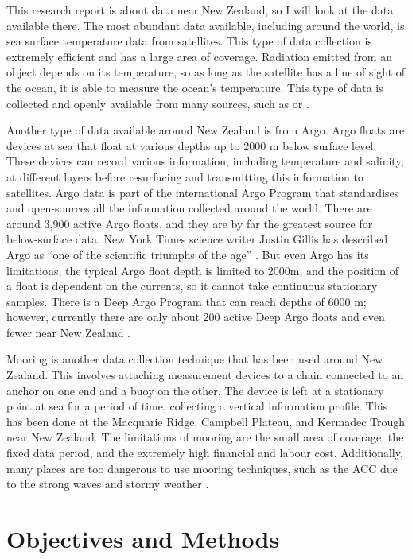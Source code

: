 \documentclass[12pt,a4paper]{article}
\begin{document}
This research report is about data near New Zealand, so I will look at the
data available there. The most abundant data available, including around the
world, is sea surface temperature data from satellites. This type of data
collection is extremely efficient and has a large area of coverage. Radiation
emitted from an object depends on its temperature, so as long as the satellite
has a line of sight of the ocean, it is able to measure the ocean's
temperature. This type of data is collected and openly available from many
sources, such as \citet{niwa-satellite} or \citet{metservice}.

Another type of data available around New Zealand is from Argo. Argo floats
are devices at sea that float at various depths up to 2000 m below surface
level. These devices can record various information, including temperature and
salinity, at different layers before resurfacing and transmitting this
information to satellites. Argo data is part of the international Argo Program
that standardises and open-sources all the information collected around the
world. There are around 3,900 active Argo floats, and they are by far the
greatest source for below-surface data. New York Times science writer Justin
Gillis has described Argo as ``one of the scientific triumphs of the age''
\citep[as cited in][]{argoprogram}. But even Argo has its limitations, the
typical Argo float depth is limited to 2000m, and the position of a float is
dependent on the currents, so it cannot take continuous stationary samples.
There is a Deep Argo Program that can reach depths of 6000 m; however,
currently there are only about 200 active Deep Argo floats and even fewer near
New Zealand \citep{argoprogram}.

Mooring is another data collection technique that has been used around New
Zealand. This involves attaching measurement devices to a chain connected to
an anchor on one end and a buoy on the other. The device is left at a
stationary point at sea for a period of time, collecting a vertical
information profile. This has been done at the Macquarie Ridge, Campbell
Plateau, and Kermadec Trough near New Zealand. The limitations of mooring are
the small area of coverage, the fixed data period, and the extremely
\pagebreak %
high financial and labour cost. Additionally, many places are too dangerous to
use mooring techniques, such as the ACC due to the strong waves and stormy
weather \citep{niwa2008}.

\section{Objectives and Methods}
\end{document}
